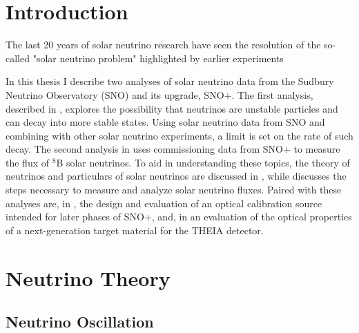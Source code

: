 \chapter{Introduction}

The last 20 years of solar neutrino research have seen the resolution of the so-called "solar neutrino problem" highlighted by earlier experiments 

In this thesis I describe two analyses of solar neutrino data from the Sudbury Neutrino Observatory (SNO) and its upgrade, SNO+.
The first analysis, described in , explores the possibility that neutrinos are unstable particles and can decay into more stable states.
Using solar neutrino data from SNO and combining with other solar neutrino experiments, a limit is set on the rate of such decay. 
The second analysis in  uses commissioning data from SNO+ to measure the flux of $^8$B solar neutrinos. 
To aid in understanding these topics, the theory of neutrinos and particulars of solar neutrinos are discussed in , while  discusses the steps necessary to measure and analyze solar neutrino fluxes.
Paired with these analyses are, in , the design and evaluation of an optical calibration source intended for later phases of SNO+, and, in  an evaluation of the optical properties of a next-generation target material for the T\textsc{HEIA} detector.

\chapter{Neutrino Theory}
\label{ch:theory}

\section{Neutrino Oscillation}

